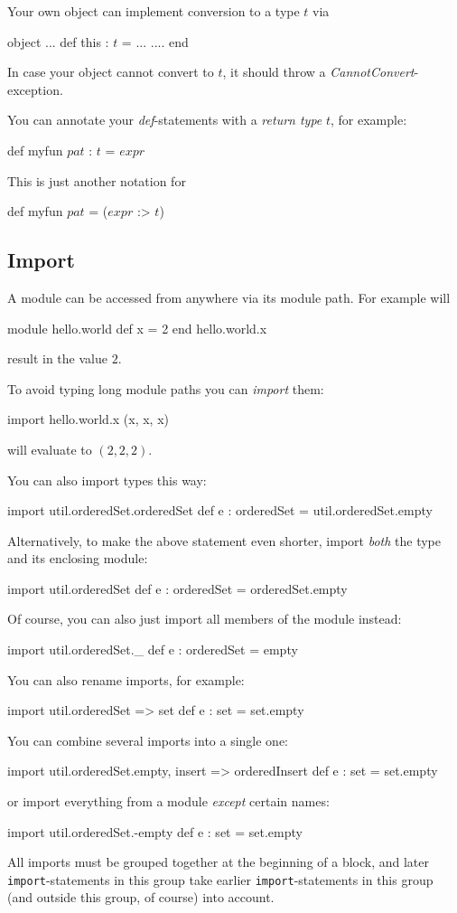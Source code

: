 \documentclass[11pt]{amsart}
\newcommand{\babelsrc}[1] {\lstinline!#1!}
\begin{document}
Your own object can implement conversion to a type $t$ via 
\begin{babellisting}
object 
  ...
  def this : $t$ = ...
  ....
end
\end{babellisting}
In case your object cannot convert to $t$, it should throw a \emph{CannotConvert}-exception.

You can annotate your \emph{def}-statements with a \emph{return type} $t$, for example:
\begin{babellisting}
def myfun $pat$ : $t$ = $expr$
\end{babellisting}
This is just another notation for
\begin{babellisting}
def myfun $pat$ = ($expr$ :> $t$)
\end{babellisting}

\subsection{Import}
A module can be accessed from anywhere via its module path. For example will 
\begin{babellisting}
module hello.world
  def x = 2
end
hello.world.x
\end{babellisting}
result in the value $2$.

To avoid typing long module paths you can \emph{import} them:
\begin{babellisting}
import hello.world.x
(x, x, x)
\end{babellisting}
will evaluate to $(2, 2, 2)$. 

You can also import types this way:
\begin{babellisting}
import util.orderedSet.orderedSet
def e : orderedSet = util.orderedSet.empty
\end{babellisting}
Alternatively, to make the above statement even shorter, import \emph{both} the type and its enclosing module:
\begin{babellisting}
import util.orderedSet
def e : orderedSet = orderedSet.empty
\end{babellisting}
Of course, you can also just import all members of the module instead:
\begin{babellisting}
import util.orderedSet._
def e : orderedSet = empty
\end{babellisting}
You can also rename imports, for example:
\begin{babellisting}
import util.orderedSet => set
def e : set = set.empty
\end{babellisting}
You can combine several imports into a single one:
\begin{babellisting}
import util.orderedSet.{empty, insert => orderedInsert} 
def e : set = set.empty
\end{babellisting}
or import everything from a module \emph{except} certain names:
\begin{babellisting}
import util.orderedSet.{-empty}
def e : set = set.empty
\end{babellisting}
All imports must be grouped together at the beginning of a block, and later \babelsrc{import}-statements in this group take earlier \babelsrc{import}-statements in this group (and outside this group, of course) into account.
\end{document}
